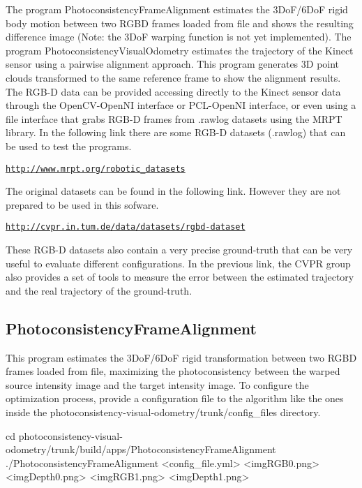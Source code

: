 The program PhotoconsistencyFrameAlignment estimates the 3DoF/6DoF rigid body motion between two RGBD frames loaded from file and shows the resulting difference image (Note: the 3DoF warping function is not yet implemented). The program PhotoconsistencyVisualOdometry estimates the trajectory of the Kinect sensor using a pairwise alignment approach. This program generates 3D point clouds transformed to the same reference frame to show the alignment results. The RGB-\/D data can be provided accessing directly to the Kinect sensor data through the OpenCV-\/OpenNI interface or PCL-\/OpenNI interface, or even using a file interface that grabs RGB-\/D frames from .rawlog datasets using the MRPT library. In the following link there are some RGB-\/D datasets (.rawlog) that can be used to test the programs.

\href{http://www.mrpt.org/robotic_datasets}{\tt http://www.mrpt.org/robotic\_\-datasets}

The original datasets can be found in the following link. However they are not prepared to be used in this sofware.

\href{http://cvpr.in.tum.de/data/datasets/rgbd-dataset}{\tt http://cvpr.in.tum.de/data/datasets/rgbd-\/dataset}

These RGB-\/D datasets also contain a very precise ground-\/truth that can be very useful to evaluate different configurations. In the previous link, the CVPR group also provides a set of tools to measure the error between the estimated trajectory and the real trajectory of the ground-\/truth.\hypertarget{index_PhotoconsistencyFrameAlignment}{}\subsection{PhotoconsistencyFrameAlignment}\label{index_PhotoconsistencyFrameAlignment}
This program estimates the 3DoF/6DoF rigid transformation between two RGBD frames loaded from file, maximizing the photoconsistency between the warped source intensity image and the target intensity image. To configure the optimization process, provide a configuration file to the algorithm like the ones inside the photoconsistency-\/visual-\/odometry/trunk/config\_\-files directory.

\begin{DoxyVerb}
cd photoconsistency-visual-odometry/trunk/build/apps/PhotoconsistencyFrameAlignment
./PhotoconsistencyFrameAlignment <config_file.yml> <imgRGB0.png> <imgDepth0.png> <imgRGB1.png> <imgDepth1.png>
\end{DoxyVerb}


